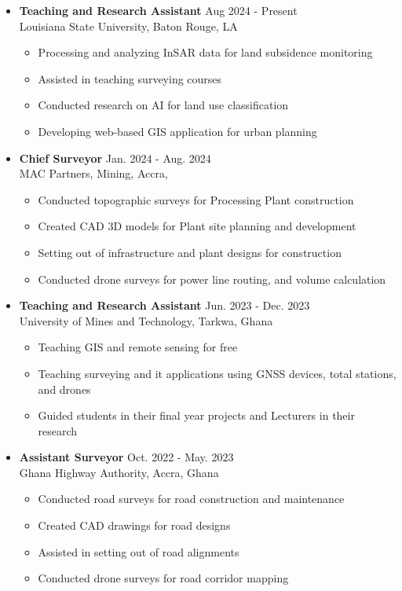 \documentclass[a4paper,10pt]{article}
\begin{document}
\begin{itemize}[leftmargin=*, noitemsep]
    \item \textbf{Teaching and Research Assistant} \hfill Aug 2024 {-} Present \\
    Louisiana State University, Baton Rouge, LA
    \begin{itemize}[noitemsep]
        \item Processing and analyzing InSAR data for land subsidence monitoring
        \item Assisted in teaching surveying courses
        \item Conducted research on AI for land use classification
        \item Developing web-based GIS application for urban planning
    \end{itemize}

    \item \textbf{Chief Surveyor} \hfill Jan. 2024 {-} Aug. 2024 \\
    MAC Partners, Mining, Accra, 
    \begin{itemize}[noitemsep]
        \item Conducted topographic surveys for Processing Plant construction
        \item Created CAD 3D models for Plant site planning and development
        \item Setting out of infrastructure and plant designs for construction
        \item Conducted drone surveys for power line routing, and volume calculation
    \end{itemize}

    \item \textbf{Teaching and Research Assistant} \hfill Jun. 2023 {-} Dec. 2023 \\
    University of Mines and Technology, Tarkwa, Ghana
    \begin{itemize}[noitemsep]
        \item Teaching GIS and remote sensing for free
        \item Teaching surveying and it applications using GNSS devices, total stations, and drones
        \item Guided students in their final year projects and Lecturers in their research
    \end{itemize}

    \item \textbf{Assistant Surveyor} \hfill Oct. 2022 {-} May. 2023 \\
    Ghana Highway Authority, Accra, Ghana
    \begin{itemize}[noitemsep]
        \item Conducted road surveys for road construction and maintenance
        \item Created CAD drawings for road designs
        \item Assisted in setting out of road alignments
        \item Conducted drone surveys for road corridor mapping
    \end{itemize}



\end{itemize}
\end{document}
